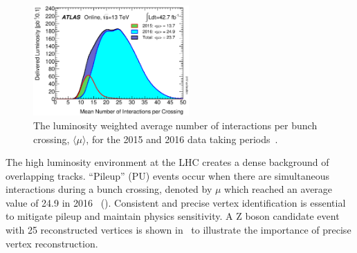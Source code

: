 \begin{figure}
    \centering
     \includegraphics[width=0.53\textwidth]{figures/ATLAS/mu_2015_2016}
     \caption[ATLAS mean interactions per bunch crossing in 2016]{The luminosity weighted average number of interactions per bunch crossing, $\langle\mu\rangle$, for the 2015 and 2016 data taking periods~\cite{Lumi_Public_Run2}.}
     \label{fig:mu_2015_2016}
\end{figure}

The high luminosity environment at the LHC creates a dense background of overlapping tracks. ``Pileup'' (PU) events occur when there are simultaneous interactions during a bunch crossing, denoted by $\mu$ which reached an average value of 24.9 in 2016~\cite{Lumi_Public_Run2} (\Fig{\ref{fig:mu_2015_2016}}). Consistent and precise vertex identification is essential to mitigate pileup and maintain physics sensitivity. A Z boson candidate event with 25 reconstructed vertices is shown in~\Fig{\ref{fig:25_ver_zmumu}} to illustrate the importance of precise vertex reconstruction. 

